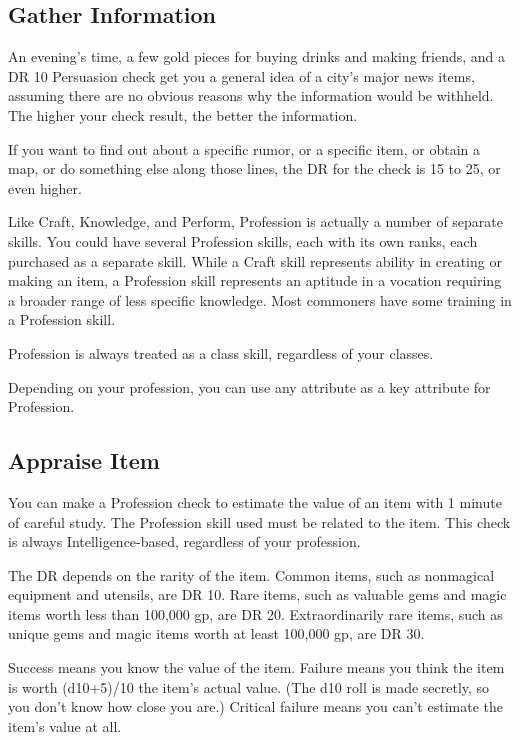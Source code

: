    \subsection{Gather Information}
        An evening's time, a few gold pieces for buying drinks and making friends, and a DR 10 Persuasion check get you a general idea of a city's major news items, assuming there are no obvious reasons why the information would be withheld. The higher your check result, the better the information.

        If you want to find out about a specific rumor, or a specific item, or obtain a map, or do something else along those lines, the DR for the check is 15 to 25, or even higher.

        Like Craft, Knowledge, and Perform, Profession is actually a number of separate skills. You could have several Profession skills, each with its own ranks, each purchased as a separate skill. While a Craft skill represents ability in creating or making an item, a Profession skill represents an aptitude in a vocation requiring a broader range of less specific knowledge. Most commoners have some training in a Profession skill.

        Profession is always treated as a class skill, regardless of your classes.

        Depending on your profession, you can use any attribute as a key attribute for Profession.

    \subsection{Appraise Item}
        You can make a Profession check to estimate the value of an item with 1 minute of careful study. The Profession skill used must be related to the item.
        This check is always Intelligence-based, regardless of your profession.

        The DR depends on the rarity of the item. Common items, such as nonmagical equipment and utensils, are DR 10. Rare items, such as valuable gems and magic items worth less than 100,000 gp, are DR 20. Extraordinarily rare items, such as unique gems and magic items worth at least 100,000 gp, are DR 30.

        Success means you know the value of the item. Failure means you think the item is worth (d10+5)/10 \x the item's actual value. (The d10 roll is made secretly, so you don't know how close you are.) Critical failure means you can't estimate the item's value at all.

